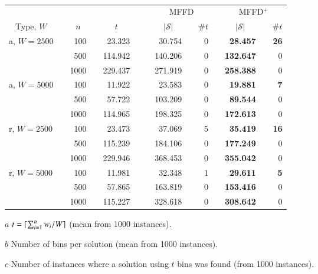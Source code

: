 \documentclass[authoryear]{elsarticle}
\begin{document}
\begin{table}[h!]
\centering
\caption{}
\begin{threeparttable}
\begin{tabular}{lcrcrc crcr crcr} %
	\toprule
	& & & & & & & \multicolumn{3}{c}{MFFD} &\phantom{ab}& \multicolumn{3}{c}{MFFD$^+$}\\
	\cmidrule{8-10} \cmidrule{12-14}
	\multicolumn{1}{c}{Type, $W$} && \multicolumn{1}{c}{$n$} && \multicolumn{1}{c}{$t$\tnote{$a$}} &&& \multicolumn{1}{c}{$|\mathcal{S}|$\tnote{$b$}} && \multicolumn{1}{c}{$\# t$\tnote{$c$}} && \multicolumn{1}{c}{$|\mathcal{S}|$} && \multicolumn{1}{c}{$\# t$}\\ \midrule	
	a, $W=2500$ && 100 && 23.323 &&& 30.754 && 0 && \textbf{28.457} && \textbf{26} \\
	&& 500 && 114.942 &&& 140.206 && 0 && \textbf{132.647} && 0 \\
	&& 1000 && 229.437 &&& 271.919 && 0 && \textbf{258.388} && 0 \\
	\midrule
	a, $W=5000$ && 100 && 11.922 &&& 23.583 && 0 && \textbf{19.881} && \textbf{7} \\
	&& 500 && 57.722 &&& 103.209 && 0 && \textbf{89.544} && 0 \\
	&& 1000 && 114.965 &&& 198.325 && 0 && \textbf{172.613} && 0 \\
	\midrule
	\midrule
	r, $W=2500$ && 100 && 23.473 &&& 37.069 && 5 && \textbf{35.419} && \textbf{16} \\
	&& 500 && 115.239 &&& 184.106 && 0 && \textbf{177.249} && 0 \\
	&& 1000 && 229.946 &&& 368.453 && 0 && \textbf{355.042} && 0 \\
	\midrule
	r, $W=5000$ && 100 && 11.981 &&& 32.348 && 1 && \textbf{29.611} && \textbf{5} \\
	&& 500 && 57.865 &&& 163.819 && 0 && \textbf{153.416} && 0\\
	&& 1000 && 115.227 &&& 328.618 && 0 && \textbf{308.642} && 0 \\
	\bottomrule
\end{tabular}
\vspace{0.2cm} %
\begin{tablenotes}
	\item[$a$] $t = \lceil\sum_{i=1}^{n} w_i / W\rceil$ (mean from 1000 instances).
	\item[$b$] Number of bins per solution (mean from 1000 instances).
	\item[$c$] Number of instances where a solution using $t$ bins was found (from 1000 instances).
\end{tablenotes}	
\end{threeparttable}	
\label{table:heuristics}
\end{table}
\end{document}
